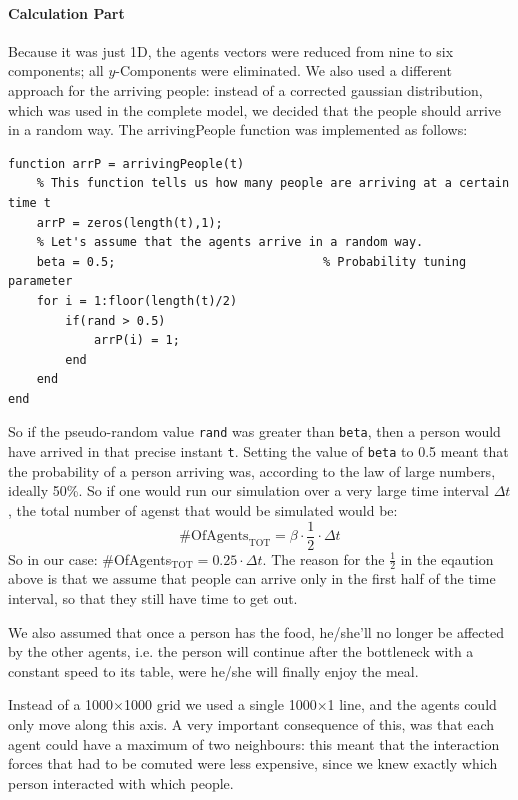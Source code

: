 \documentclass[11pt]{article}
\begin{document}
\paragraph{Calculation Part}
Because it was just 1D, the agents vectors were reduced from nine to six components; all $y$-Components were eliminated. We also used a different approach for the arriving people: instead of a corrected gaussian distribution, which was used in the complete model, we decided that the people should arrive in a random way.
The arrivingPeople function was implemented as follows: 
\begin{lstlisting}[frame=lines]
function arrP = arrivingPeople(t)
    % This function tells us how many people are arriving at a certain time t
    arrP = zeros(length(t),1);
    % Let's assume that the agents arrive in a random way.
    beta = 0.5; 							% Probability tuning parameter
    for i = 1:floor(length(t)/2)
        if(rand > 0.5)
            arrP(i) = 1;
        end
    end
end
\end{lstlisting}
So if the pseudo-random value \verb"rand" was greater than \verb"beta", then a person would have arrived in that precise instant \verb"t". Setting the value of \verb"beta" to 0.5 meant that the probability of a person arriving was, according to the law of large numbers, ideally 50\%. So if one would run our simulation over a very large time interval $\Delta t$, the total number of agenst that would be simulated would be:
\begin{equation*}
	\#\text{OfAgents}_\text{TOT} = \beta\cdot\frac{1}{2}\cdot\Delta t
\end{equation*}
So in our case: $\#$OfAgents$_\text{TOT} = 0.25\cdot\Delta t$. The reason for the $\frac{1}{2}$ in the eqaution above is that we assume that people can arrive only in the first half of the time interval, so that they still have time to get out.

We also assumed that once a person has the food, he/she'll no longer be affected by the other agents, i.e. the person will continue after the bottleneck with a constant speed to its table, were he/she will finally enjoy the meal.

Instead of a 1000$\times$1000 grid we used a single 1000$\times$1 line, and the agents could only move along this axis. A very important consequence of this, was that each agent could have a maximum of two neighbours: this meant that the interaction forces that had to be comuted were less expensive, since we knew exactly which person interacted with which people.
\end{document}

